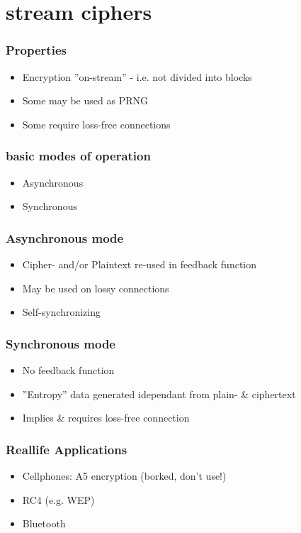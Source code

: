 
\section{stream ciphers}
\begin{frame}
\frametitle{Properties}
	\begin{itemize}
		\item<2-> Encryption ''on-stream'' - i.e. not divided into blocks
		\item<3-> Some may be used as PRNG
		\item<4-> Some require loss-free connections
	\end{itemize}
\end{frame}
\begin{frame}
\frametitle{basic modes of operation}
	\begin{itemize}
		\item<2-> Asynchronous
		\item<3-> Synchronous
	\end{itemize}
\end{frame}

\begin{frame}
\frametitle{Asynchronous mode}
	\begin{itemize}
		\item<2-> Cipher- and/or Plaintext re-used in feedback function
		\item<3-> May be used on lossy connections
		\item<4-> Self-synchronizing
	\end{itemize}
\end{frame}


\begin{frame}
\frametitle{Synchronous mode}
	\begin{itemize}
		\item<2-> No feedback function
		\item<3-> ''Entropy'' data generated idependant from plain- \& ciphertext
		\item<4-> Implies \& requires loss-free connection
	\end{itemize}
\end{frame}

\begin{frame}
\frametitle{Reallife Applications}
	\begin{itemize}
		\item<2-> Cellphones: A5 encryption (borked, don't use!)
		\item<3-> RC4 (e.g. WEP)
		\item<4-> Bluetooth
	\end{itemize}
\end{frame}


